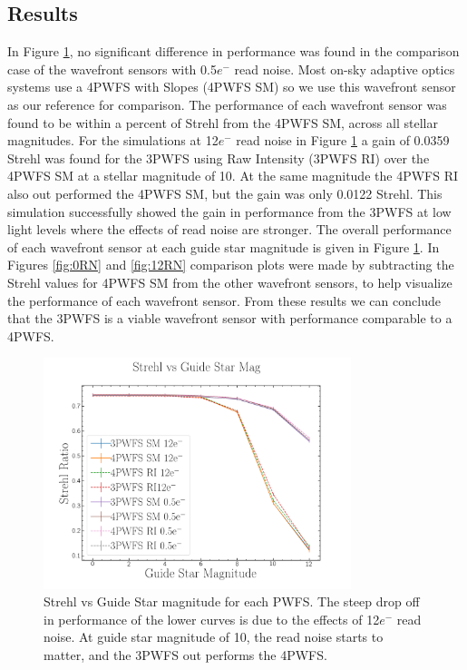 \subsection{Results}

In Figure \ref{fig:overall}, no significant difference in performance was found in the comparison case of the wavefront sensors with 0.5$e^-$ read noise. Most on-sky adaptive optics systems use a 4PWFS with Slopes (4PWFS SM) so we use this wavefront sensor as our reference for comparison. The performance of each wavefront sensor was found to be within a percent of Strehl from the 4PWFS SM, across all stellar magnitudes. For the simulations at 12$e^-$ read noise in Figure \ref{fig:overall} a gain of 0.0359 Strehl was found for the 3PWFS using Raw Intensity (3PWFS RI) over the 4PWFS SM at a stellar magnitude of 10. At the same magnitude the 4PWFS RI also out performed the 4PWFS SM, but the gain was only 0.0122 Strehl. This simulation successfully showed the gain in performance from the 3PWFS at low light levels where the effects of read noise are stronger. The overall performance of each wavefront sensor at each guide star magnitude is given in Figure \ref{fig:overall}. In Figures \ref{fig:0RN} and \ref{fig:12RN} comparison plots were made by subtracting the Strehl values for 4PWFS SM from the other wavefront sensors, to help visualize the performance of each wavefront sensor. From these results we can conclude that the 3PWFS is a viable wavefront sensor with performance comparable to a 4PWFS.


\begin{figure}[h]
    \centering
    \includegraphics[width=0.8\textwidth]{Chapter Materials/Chapter Four Materials/StrehlvGuideStar4v3.png}
    \caption{Strehl vs Guide Star magnitude for each PWFS. The steep drop off in performance of the lower curves is due to the effects of 12$e^-$ read noise. At guide star magnitude of 10, the read noise starts to matter, and the 3PWFS out performs the 4PWFS. }
    \label{fig:overall}
\end{figure}



